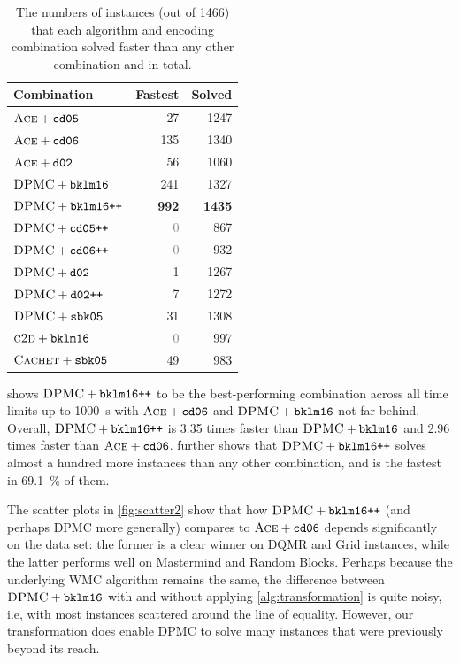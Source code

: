 \begin{table}[t]
  \centering
  \begin{tabular}{lrr}
    \toprule
    Combination & Fastest & Solved \\
    \midrule
    $\textsc{Ace} + \texttt{cd05}$ & 27 & 1247 \\
    $\textsc{Ace} + \texttt{cd06}$ & 135 & 1340 \\
    $\textsc{Ace} + \texttt{d02}$ & 56 & 1060 \\
    $\textsc{DPMC} + \texttt{bklm16}$ & 241 & 1327 \\
    $\textsc{DPMC} + \texttt{bklm16++}$ & \textbf{992} & \textbf{1435} \\
    $\textsc{DPMC} + \texttt{cd05++}$ & \textcolor{gray}{0} & 867 \\
    $\textsc{DPMC} + \texttt{cd06++}$ & \textcolor{gray}{0} & 932 \\
    $\textsc{DPMC} + \texttt{d02}$ & 1 & 1267 \\
    $\textsc{DPMC} + \texttt{d02++}$ & 7 & 1272 \\
    $\textsc{DPMC} + \texttt{sbk05}$ & 31 & 1308 \\
    $\textsc{c2d} + \texttt{bklm16}$ & \textcolor{gray}{0} & 997 \\
    $\textsc{Cachet} + \texttt{sbk05}$ & 49 & 983 \\
    \bottomrule
  \end{tabular}
  \caption{The numbers of instances (out of 1466) that each algorithm and
    encoding combination solved faster than any other combination and in
    total.}\label{tbl:performance}
\end{table}

 shows $\textsc{DPMC}+\texttt{bklm16++}$ to be the
best-performing combination across all time limits up to \SI{1000}{\second} with
$\textsc{Ace} + \texttt{cd06}$ and $\textsc{DPMC}+\texttt{bklm16}$ not far
behind. Overall, $\textsc{DPMC}+\texttt{bklm16++}$ is 3.35 times faster than
$\textsc{DPMC}+\texttt{bklm16}$ and 2.96 times faster than
$\textsc{Ace}+\texttt{cd06}$.  further shows that
$\textsc{DPMC}+\texttt{bklm16++}$ solves almost a hundred more instances than
any other combination, and is the fastest in \SI{69.1}{\percent} of them.

The scatter plots in \cref{fig:scatter2} show that how $\textsc{DPMC} +
\texttt{bklm16++}$ (and perhaps \textsc{DPMC} more generally) compares to
$\textsc{Ace} + \texttt{cd06}$ depends significantly on the data set: the former
is a clear winner on DQMR and Grid instances, while the latter performs well on
Mastermind and Random Blocks. Perhaps because the underlying WMC algorithm
remains the same, the difference between $\textsc{DPMC} + \texttt{bklm16}$ with
and without applying \cref{alg:transformation} is quite noisy, i.e, with most
instances scattered around the line of equality. However, our transformation
does enable \textsc{DPMC} to solve many instances that were previously beyond
its reach.

